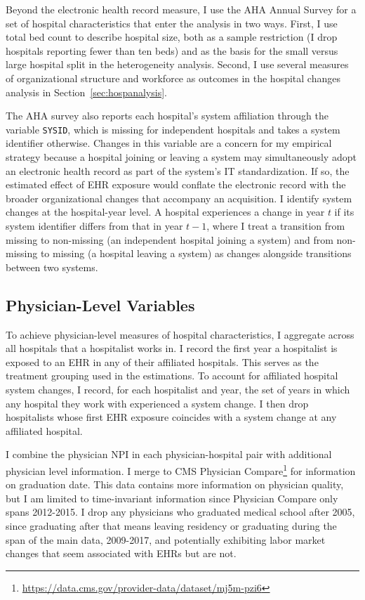 \documentclass[12pt]{article}
\begin{document}
Beyond the electronic health record measure, I use the AHA Annual Survey for a set of hospital characteristics that enter the analysis in two ways. First, I use total bed count to describe hospital size, both as a sample restriction (I drop hospitals reporting fewer than ten beds) and as the basis for the small versus large hospital split in the heterogeneity analysis. Second, I use several
measures of organizational structure and workforce as outcomes in the hospital changes analysis in Section~\ref{sec:hospanalysis}. 

The AHA survey also reports each hospital's system affiliation through the variable \texttt{SYSID}, which is missing for independent hospitals and takes a system identifier otherwise. Changes in this variable are a concern for my empirical strategy because a hospital joining or leaving a system may simultaneously adopt an electronic health record as part of the system's IT standardization. If so, the estimated effect of EHR exposure would conflate the electronic record with the broader organizational changes that accompany an acquisition. I identify system changes at the hospital-year level. A hospital experiences a change in year $t$ if its system identifier differs from that in year $t-1$, where I treat a transition from missing to non-missing (an independent hospital joining a system) and from non-missing to missing (a hospital leaving a system) as changes alongside transitions between two systems. 


\subsection{Physician-Level Variables}

To achieve physician-level measures of hospital characteristics, I aggregate across all hospitals that a hospitalist works in. I record the first year a hospitalist is exposed to an EHR in any of their affiliated hospitals. This serves as the treatment grouping used in the \citet{callaway2021difference} estimations. To account for affiliated hospital system changes, I record, for each hospitalist and year, the set of years in which any hospital they work with experienced a system change. I then drop hospitalists whose first EHR exposure coincides with a system change at any affiliated hospital. 

I combine the physician NPI in each physician-hospital pair with additional physician level information. I merge to CMS Physician Compare\footnote{\hyperlink{https://data.cms.gov/provider-data/dataset/mj5m-pzi6}{https://data.cms.gov/provider-data/dataset/mj5m-pzi6}} for information on graduation date. This data contains more information on physician quality, but I am limited to time-invariant information since Physician Compare only spans 2012-2015. I drop any physicians who graduated medical school after 2005, since graduating after that means leaving residency or graduating during the span of the main data, 2009-2017, and potentially exhibiting labor market changes that seem associated with EHRs but are not. 
\end{document}
